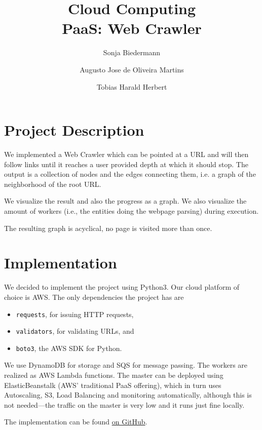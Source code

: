 \documentclass[english]{scrartcl}
\begin{document}
\title{Cloud Computing\\PaaS: Web Crawler}

\author{Sonja Biedermann \and Augusto Jose de Oliveira Martins \and Tobias Harald Herbert}

\maketitle
\tableofcontents

\section{Project Description}

We implemented a Web Crawler which can be pointed at a URL and will then follow
links until it reaches a user provided depth at which it should stop. The
output is a collection of nodes and the edges connecting them, i.e. a graph of
the neighborhood of the root URL.

We visualize the result and also the progress as a graph. We also visualize
the amount of workers (i.e., the entities doing the webpage parsing) during
execution.

The resulting graph is acyclical, no page is visited more than once.

\section{Implementation}

We decided to implement the project using Python3. Our cloud platform of choice
is AWS. The only dependencies the project has are

\begin{itemize}
    \item \texttt{requests}, for issuing HTTP requests,
    \item \texttt{validators}, for validating URLs, and
    \item \texttt{boto3}, the AWS SDK for Python.
\end{itemize}

We use DynamoDB for storage and SQS for message passing. The workers are realized
as AWS Lambda functions. The master can be deployed using ElasticBeanstalk (AWS'
traditional PaaS offering), which in turn uses Autoscaling, S3, Load Balancing
and monitoring automatically, although this is not needed---the traffic on the
master is very low and it runs just fine locally.

The implementation can be found \href{https://github.com/biederfrau/cloud-computing-paas}{on GitHub}.
\end{document}
